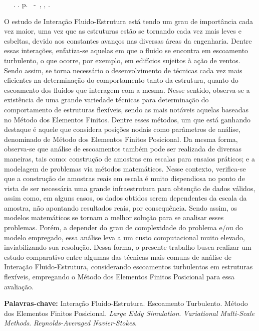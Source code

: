 \documentclass[_ArquivoPrincipal.tex]{subfiles}
\begin{document}
	\setlength{\absparsep}{18pt} %
	\begin{resumo}
		\begin{flushleft} 
			\setlength{\absparsep}{0pt} %
			\SingleSpacing 
			\imprimirautorabr~ ~\textbf{\imprimirtitulo}.	\imprimirdata. \pageref{LastPage}p. 
			\imprimirtipotrabalho~-~\imprimirinstituicao, \imprimirlocal, \imprimirdata. 
		\end{flushleft}
		\OnehalfSpacing
		
		O estudo de Interação Fluido-Estrutura está tendo um grau de importância cada vez maior, uma vez que as estruturas estão se tornando cada vez mais leves e esbeltas, devido aos constantes avanços nas diversas áreas da engenharia. Dentre essas interações, enfatiza-se aquelas em que o fluido se encontra em escoamento turbulento, o que ocorre, por exemplo, em edifícios sujeitos à ação de ventos. Sendo assim, se torna necessário o desenvolvimento de técnicas cada vez mais eficientes na determinação do comportamento tanto da estrutura, quanto do escoamento dos fluidos que interagem com a mesma. Nesse sentido, observa-se a existência de uma grande variedade técnicas para determinação do comportamento de estruturas flexíveis, sendo as mais notáveis aquelas baseadas no Método dos Elementos Finitos. Dentre esses métodos, um que está ganhando destaque é aquele que considera posições nodais como parâmetros de análise, denominado de Método dos Elementos Finitos Posicional. Da mesma forma, observa-se que análise de escoamentos também pode ser realizada de diversas maneiras, tais como: construção de amostras em escalas para ensaios práticos; e a modelagem de problemas via métodos matemáticos. Nesse contexto, verifica-se que a construção de amostras reais em escala é muito dispendiosa no ponto de vista de ser necessária uma grande infraestrutura para obtenção de dados válidos, assim como, em alguns casos, os dados obtidos serem dependentes da escala da amostra, não apontando resultados reais, por consequência. Sendo assim, os modelos matemáticos se tornam a melhor solução para se analisar esses problemas. Porém, a depender do grau de complexidade do problema e/ou do modelo empregado, essa análise leva a um custo computacional muito elevado, inviabilizando sua resolução. Dessa forma, o presente trabalho busca realizar um estudo comparativo entre algumas das técnicas mais comuns de análise de Interação Fluido-Estrutura, considerando escoamentos turbulentos em estruturas flexíveis, empregando o Método dos Elementos Finitos Posicional para essa avaliação.
		
		\textbf{Palavras-chave:} Interação Fluido-Estrutura. Escoamento Turbulento. Método dos Elementos Finitos Posicional. \textit{Large Eddy Simulation}. \textit{Variational Multi-Scale Methods}. \textit{Reynolds-Averaged Navier-Stokes}.
	\end{resumo}
\end{document}
